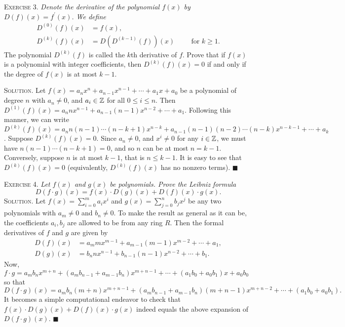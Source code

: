 \documentclass[11pt, leqno]{article}
\newcommand{\done}{\ensuremath{\blacksquare}}
\begin{document}
\textsc{Exercise 3}. \emph{Denote the derivative of the polynomial $f(x)$ by $D(f)(x) = f^{\prime}(x)$. We define 
\begin{align*}
  D^{(0)}(f)(x) &= f(x), \\
  D^{(k)}(f)(x) &= D\left( D^{(k-1)}(f) \right) (x) \hspace{1cm} \text{for } k\geq 1.
\end{align*}}The polynomial $D^{(k)}(f)$ is called the $k$th derivative of $f$. Prove that if $f(x)$ is a polynomial with integer coefficients, then $D^{(k)}(f)(x) = 0$ if and only if the degree of $f(x)$ is at most $k-1$.

\textsc{Solution}. Let $f(x) = a_nx^n + a_{n-1}x^{n-1} + \cdots + a_1x + a_0$ be a polynomial of degree $n$ with $a_n \ne 0$, and $a_i \in \mathbb{Z}$ for all $0\leq i \leq n$. Then $D^{(1)}(f)(x) = a_nnx^{n-1} + a_{n-1}(n-1)x^{n-2} + \cdots + a_1$. Following this manner, we can write $D^{(k)}(f)(x) = a_nn(n-1)\cdots (n-k+1)x^{n-k} + a_{n-1}(n-1)(n-2)\cdots (n-k)x^{n-k-1} + \cdots + a_k$. Suppose $D^{(k)}(f)(x) = 0$. Since $a_n\ne 0$, and $x^i\ne 0$ for any $i\in \mathbb{Z}$, we must have $n(n-1)\cdots (n-k+1) = 0$, and so $n$ can be at most $n = k-1$. Conversely, suppose $n$ is at most $k-1$, that is $n \leq k-1$. It is easy to see that $D^{(k)}(f)(x) = 0$ (equivalently, $D^{(k)}(f)(x)$ has no nonzero terms). \done

\textsc{Exercise 4}. \emph{Let $f(x)$ and $g(x)$ be polynomials. Prove the Leibniz formula 
\begin{displaymath}
D(f\cdot g)(x) = f(x)\cdot D(g)(x) + D(f)(x)\cdot g(x).
\end{displaymath}}\textsc{Solution}. Let $f(x) = \sum_{i=0}^m a_ix^i$ and $g(x) = \sum_{j=0}^{n}b_jx^j$ be any two polynomials with $a_m \ne 0$ and $b_n \ne 0$. To make the result as general as it can be, the coefficients $a_i, b_j$ are allowed to be from any ring $R$. Then the formal derivatives of $f$ and $g$ are given by 
\begin{align*}
  D(f)(x) &= a_mmx^{m-1} + a_{m-1}(m-1)x^{m-2} + \cdots + a_1, \\
  D(g)(x) &= b_nnx^{n-1} + b_{n-1}(n-1)x^{n-2} + \cdots + b_1.
\end{align*}
Now, $f\cdot g = a_mb_nx^{m+n} + (a_mb_{n-1}+a_{m-1}b_n)x^{m+n-1} + \cdots + (a_1b_0+a_0b_1)x + a_0b_0$ so that 
\begin{displaymath}
  D(f\cdot g)(x) = a_mb_n(m+n)x^{m+n-1} + (a_mb_{n-1}+a_{m-1}b_n)(m+n-1)x^{m+n-2} + \cdots + (a_1b_0 + a_0b_1).
\end{displaymath}
It becomes a simple computational endeavor to check that $f(x)\cdot D(g)(x) + D(f)(x)\cdot g(x)$ indeed equals the above expansion of $D(f\cdot g)(x)$. \done
\end{document}
